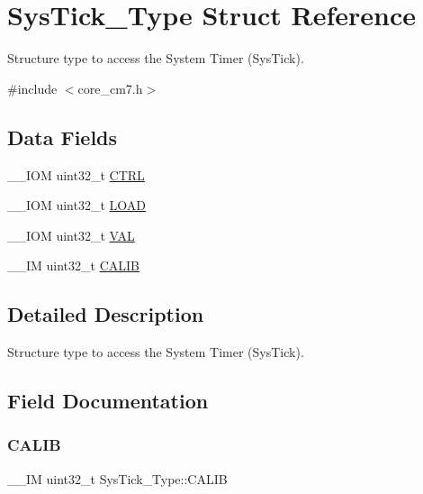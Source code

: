 \hypertarget{structSysTick__Type}{}\section{Sys\+Tick\+\_\+\+Type Struct Reference}
\label{structSysTick__Type}


Structure type to access the System Timer (Sys\+Tick).  




{\ttfamily \#include $<$core\+\_\+cm7.\+h$>$}

\subsection*{Data Fields}
\begin{DoxyCompactItemize}
\item 
\+\_\+\+\_\+\+I\+OM uint32\+\_\+t \mbox{\hyperlink{structSysTick__Type_a875e7afa5c4fd43997fb544a4ac6e37e}{C\+T\+RL}}
\item 
\+\_\+\+\_\+\+I\+OM uint32\+\_\+t \mbox{\hyperlink{structSysTick__Type_a4780a489256bb9f54d0ba8ed4de191cd}{L\+O\+AD}}
\item 
\+\_\+\+\_\+\+I\+OM uint32\+\_\+t \mbox{\hyperlink{structSysTick__Type_a9b5420d17e8e43104ddd4ae5a610af93}{V\+AL}}
\item 
\+\_\+\+\_\+\+IM uint32\+\_\+t \mbox{\hyperlink{structSysTick__Type_afcadb0c6d35b21cdc0018658a13942de}{C\+A\+L\+IB}}
\end{DoxyCompactItemize}


\subsection{Detailed Description}
Structure type to access the System Timer (Sys\+Tick). 

\subsection{Field Documentation}
\mbox{\label{structSysTick__Type_afcadb0c6d35b21cdc0018658a13942de}} 
\subsubsection{\texorpdfstring{CALIB}{CALIB}}
{\footnotesize\ttfamily \+\_\+\+\_\+\+IM uint32\+\_\+t Sys\+Tick\+\_\+\+Type\+::\+C\+A\+L\+IB}

